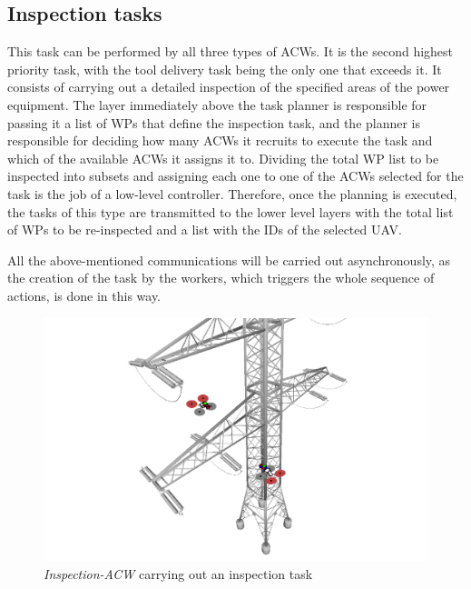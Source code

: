 \subsection{Inspection tasks}
\label{subsec:InspectionTasks}
This task can be performed by all three types of \glspl{ACW}. It is the second highest priority task, with the tool delivery task being the only one that exceeds it. It consists of carrying out a detailed inspection of the specified areas of the power equipment. The layer immediately above the task planner is responsible for passing it a list of \glspl{WP} that define the inspection task, and the planner is responsible for deciding how many \glspl{ACW} it recruits to execute the task and which of the available \glspl{ACW} it assigns it to. Dividing the total \gls{WP} list to be inspected into subsets and assigning each one to one of the \glspl{ACW} selected for the task is the job of a low-level controller. Therefore, once the planning is executed, the tasks of this type are transmitted to the lower level layers with the total list of \glspl{WP} to be re-inspected and a list with the \glspl{ID} of the selected \gls{UAV}.

All the above-mentioned communications will be carried out asynchronously, as the creation of the task by the workers, which triggers the whole sequence of actions, is done in this way.

\begin{figure}[htbp]
    \centering
    \includegraphics[width=1\linewidth]
    {ProblemFormulation/figures/inspection_task.pdf}
    \caption{\textit{Inspection-ACW} carrying out an inspection task}
    \label{fig:inspection_task}
\end{figure}

